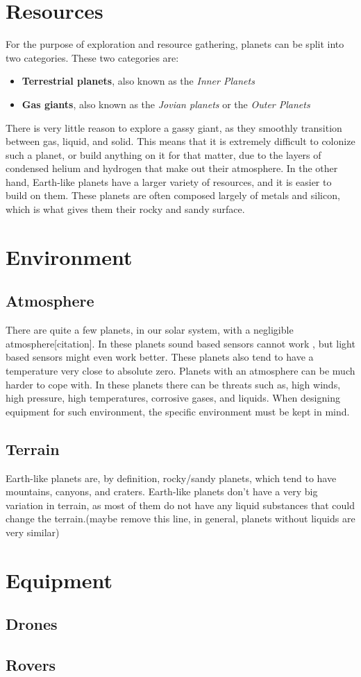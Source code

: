 \clearpage

\section{Resources}
For the purpose of exploration and resource gathering, planets can be split into two categories. These two categories are:\cite{planettypes}
\begin{itemize}
	\item{\textbf{Terrestrial planets}, also known as the \textit{Inner Planets}}
	\item{\textbf{Gas giants}, also known as the \textit{Jovian planets} or the \textit{Outer Planets}}
\end{itemize}

There is very little reason to explore a gassy giant, as they smoothly transition between gas, liquid, and solid. This means that it is extremely difficult to colonize such a planet, or build anything on it for that matter, due to the layers of condensed helium and hydrogen that make out their atmosphere\cite{outerplanetatmosphere}.
In the other hand, Earth-like planets have a larger variety of resources, and it is easier to build on them. These planets are often composed largely of metals and silicon, which is what gives them their rocky and sandy surface.

\section{Environment}
\subsection{Atmosphere}
There are quite a few planets, in our solar system, with a negligible atmosphere[citation]. In these planets sound based sensors cannot work
, but light based sensors might even work better. These planets also tend to have a temperature very close to absolute zero\cite{planetstemp}.
Planets with an atmosphere can be much harder to cope with. In these planets there can be threats such as, high winds, high pressure, high temperatures, corrosive gases, and liquids. When designing equipment for such environment, the specific environment must be kept in mind.

\subsection{Terrain}
Earth-like planets are, by definition, rocky/sandy planets, which tend to have mountains, canyons, and craters.
Earth-like planets don't have a very big variation in terrain, as most of them do not have any liquid substances that could change the terrain.(maybe remove this line, in general, planets without liquids are very similar)

\section{Equipment}
\subsection{Drones}
\subsection{Rovers}
